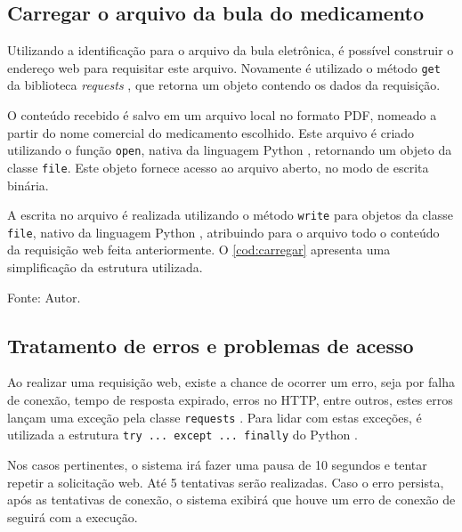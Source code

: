 \subsection{Carregar o arquivo da bula do medicamento}\label{ssec:arquivo}

Utilizando a identificação para o arquivo da bula eletrônica, é possível construir o endereço web para requisitar este arquivo.
Novamente é utilizado o método \lstinline|get| da biblioteca \textit{requests} \cite{reitz2024request}, que retorna um objeto contendo os dados da requisição.

O conteúdo recebido é salvo em um arquivo local no formato \acs{PDF}, nomeado a partir do nome comercial do medicamento escolhido.
Este arquivo é criado utilizando o função \lstinline|open|, nativa da linguagem Python \cite{pythonOpen}, retornando um objeto da classe \lstinline|file|.
Este objeto fornece acesso ao arquivo aberto, no modo de escrita binária.

A escrita no arquivo é realizada utilizando o método \lstinline|write| para objetos da classe \lstinline|file|, nativo da linguagem Python \cite{pythonWrite}, atribuindo para o arquivo todo o conteúdo da requisição web feita anteriormente.
O \autoref{cod:carregar} apresenta uma simplificação da estrutura utilizada.

\begin{lstfloat}[htbp]
    \centering
    
    \caption*{Fonte: Autor.}
\end{lstfloat}


\subsection{Tratamento de erros e problemas de acesso}

Ao realizar uma requisição web, existe a chance de ocorrer um erro, seja por falha de conexão, tempo de resposta expirado, erros no HTTP, entre outros, estes erros lançam uma exceção pela classe \lstinline|requests| \cite{reitz2024request}.
Para lidar com estas exceções, é utilizada a estrutura \lstinline|try ... except ... finally| do Python \cite{refsnesdata2024, stack2013tryrequest}.

Nos casos pertinentes, o sistema irá fazer uma pausa de \num{10} segundos e tentar repetir a solicitação web.
Até \num{5} tentativas serão realizadas.
Caso o erro persista, após as tentativas de conexão, o sistema exibirá que houve um erro de conexão de seguirá com a execução.

